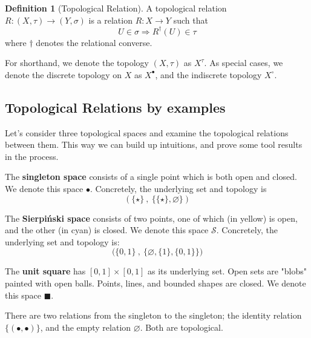 \documentclass{tufte-handout}
\theoremstyle{definition}
\newtheorem{defn}[theorem]{Definition}
\newtheorem{rem}[theorem]{Reminder}
\begin{document}
\begin{defn}[Topological Relation]\label{defn:toprelation}
A topological relation $R: (X,\tau) \rightarrow (Y,\sigma)$ is a relation $R: X \rightarrow Y$ such that \[U \in \sigma \Rightarrow R^{\dag}(U) \in \tau\] where $\dag$ denotes the relational converse.
\end{defn}

For shorthand, we denote the topology $(X,\tau)$ as $X^{\tau}$. As special cases, we denote the discrete topology on $X$ as $X^{\bullet}$, and the indiscrete topology $X^{\circ}$.

\newpage

\begin{fullwidth}

\section{Topological Relations by examples}

Let's consider three topological spaces and examine the topological relations between them. This way we can build up intuitions, and prove some tool results in the process.

The \textbf{singleton space} consists of a single point which is both open and closed. We denote this space $\bullet$. Concretely, the underlying set and topology is
\[(\{\star\} \ , \ \{\{\star\},\varnothing\})\] 

The \textbf{Sierpi\'{n}ski space} consists of two points, one of which (in yellow) is open, and the other (in cyan) is closed. We denote this space $\mathcal{S}$. Concretely, the underlying set and topology is:
\[\big( \{0,1\} \ , \ \{ \varnothing, \{ 1 \} , \{ 0,1\} \} \big)\]

The \textbf{unit square} has $[0,1] \times [0,1]$ as its underlying set.  Open sets are "blobs" painted with open balls. Points, lines, and bounded shapes are closed. We denote this space $\blacksquare$.
\end{fullwidth}

\newthought{$\bullet \rightarrow \bullet$:} There are two relations from the singleton to the singleton; the identity relation $\{ (\bullet,\bullet) \}$, and the empty relation $\varnothing$. Both are topological.
\end{document}

